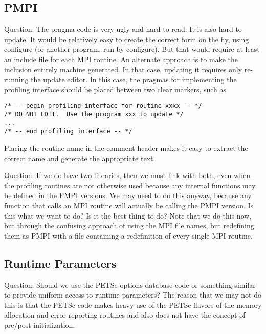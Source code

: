 \documentclass{article}
\begin{document}
\subsection{PMPI}
Question: The pragma code is very ugly and hard to read.  It is also hard to
update.
It would be relatively
easy to create the correct form on the fly, using configure (or
another program, run by configure).  But that
would require at least an include file for each MPI routine.
An alternate approach is to make the inclusion entirely machine
generated.  In that case, updating it requires only re-running the
update editor.  In this case, the pragmas for implementing the
profiling interface should be placed between two clear markers, such
as 
\begin{verbatim}
/* -- begin profiling interface for routine xxxx -- */
/* DO NOT EDIT.  Use the program xxx to update */
...
/* -- end profiling interface -- */
\end{verbatim}

Placing the routine name in the comment header makes it easy to
extract the correct name and generate the appropriate text.

Question: If we do have two libraries, then we must link with both,
even when the profiling routines are not otherwise used because any
internal functions may be defined in the PMPI versions.  We may need
to do this anyway, because any function that calls an MPI routine will
actually be calling the PMPI version.  Is this what we want to do?  Is
it the best thing to do?  Note that we do this now, but through the
confusing approach of using the MPI file names, but redefining them as PMPI
with a file containing a redefinition of every single MPI routine.

\subsection{Runtime Parameters}
Question: Should we use the PETSc options database code or something similar
to provide uniform access to runtime parameters?  
The reason that we may not do this is that the PETSc code makes heavy use of
the PETSc flavors of the memory allocation and error reporting routines and
also does not have the concept of pre/post initialization.
\end{document}
